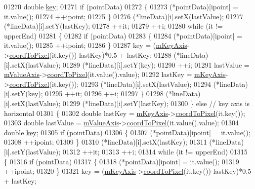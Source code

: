 \begin{DoxyCode}
01270     \textcolor{keywordtype}{double} \hyperlink{a00116_a94bb892c30911cd62cba0707a5395be4}{key};
01271     \textcolor{keywordflow}{if} (pointData)
01272     \{
01273       (*pointData)[ipoint] = it.value();
01274       ++ipoint;
01275     \}
01276     (*lineData)[i].setX(lastValue);
01277     (*lineData)[i].setY(lastKey);
01278     ++it;
01279     ++i;
01280     \textcolor{keywordflow}{while} (it != upperEnd)
01281     \{
01282       \textcolor{keywordflow}{if} (pointData)
01283       \{
01284         (*pointData)[ipoint] = it.value();
01285         ++ipoint;
01286       \}
01287       key = (\hyperlink{a00024_a692421b963472fa6e16156a74ba96832}{mKeyAxis}->\hyperlink{a00025_a985ae693b842fb0422b4390fe36d299a}{coordToPixel}(it.key())-lastKey)*0.5 + lastKey;
01288       (*lineData)[i].setX(lastValue);
01289       (*lineData)[i].setY(key);
01290       ++i;
01291       lastValue = \hyperlink{a00024_acfc46d619ab9598be33b64146da45822}{mValueAxis}->\hyperlink{a00025_a985ae693b842fb0422b4390fe36d299a}{coordToPixel}(it.value().value);
01292       lastKey = \hyperlink{a00024_a692421b963472fa6e16156a74ba96832}{mKeyAxis}->\hyperlink{a00025_a985ae693b842fb0422b4390fe36d299a}{coordToPixel}(it.key());
01293       (*lineData)[i].setX(lastValue);
01294       (*lineData)[i].setY(key);
01295       ++it;
01296       ++i;
01297     \}
01298     (*lineData)[i].setX(lastValue);
01299     (*lineData)[i].setY(lastKey);
01300   \} \textcolor{keywordflow}{else} \textcolor{comment}{// key axis is horizontal}
01301   \{
01302     \textcolor{keywordtype}{double} lastKey = \hyperlink{a00024_a692421b963472fa6e16156a74ba96832}{mKeyAxis}->\hyperlink{a00025_a985ae693b842fb0422b4390fe36d299a}{coordToPixel}(it.key());
01303     \textcolor{keywordtype}{double} lastValue = \hyperlink{a00024_acfc46d619ab9598be33b64146da45822}{mValueAxis}->\hyperlink{a00025_a985ae693b842fb0422b4390fe36d299a}{coordToPixel}(it.value().value);
01304     \textcolor{keywordtype}{double} \hyperlink{a00116_a94bb892c30911cd62cba0707a5395be4}{key};
01305     \textcolor{keywordflow}{if} (pointData)
01306     \{
01307       (*pointData)[ipoint] = it.value();
01308       ++ipoint;
01309     \}
01310     (*lineData)[i].setX(lastKey);
01311     (*lineData)[i].setY(lastValue);
01312     ++it;
01313     ++i;
01314     \textcolor{keywordflow}{while} (it != upperEnd)
01315     \{
01316       \textcolor{keywordflow}{if} (pointData)
01317       \{
01318         (*pointData)[ipoint] = it.value();
01319         ++ipoint;
01320       \}
01321       key = (\hyperlink{a00024_a692421b963472fa6e16156a74ba96832}{mKeyAxis}->\hyperlink{a00025_a985ae693b842fb0422b4390fe36d299a}{coordToPixel}(it.key())-lastKey)*0.5 + lastKey;

\end{DoxyCode}

